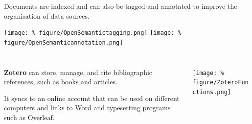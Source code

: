 \documentclass[unknownkeysallowed,usepdftitle=false, parskip=full, aspectratio=169]{beamer}
\newcommand{\secvariable}{nothing}
\newcommand{\mysection}[1]{\renewcommand{\secvariable}{#1}
}
\begin{document}
\begin{frame}

Documents are indexed and can also be tagged and annotated to improve the organisation of data sources.
  \vspace{0.5cm}

\texttt{[image: \%
figure/OpenSemantictagging.png]} 
\texttt{[image: \%
figure/OpenSemanticannotation.png]}  

\begin{columns}
\begin{column}[t]{1.1\textwidth}
\end{column}
\end{columns}


\end{frame}

\mysection{slab}

\begin{frame}\label{\secvariable}
  \begin{columns}[t]
  \begin{column}[c]{0.3\textwidth}
\textbf{Zotero} can store, manage, and cite bibliographic references, such as books and articles.\par
  \vspace{6pt}
It syncs to an online account that can be used on different computers and links to Word and typesetting programs such as Overleaf.
    \end{column}
    \begin{column}[c]{0.7\textwidth}
    \parbox{\linewidth}{
\texttt{[image: \%
figure/ZoteroFunctions.png]}

}
    \end{column}
    
  \end{columns}


\end{frame}






\mysection{minor}
\end{document}
